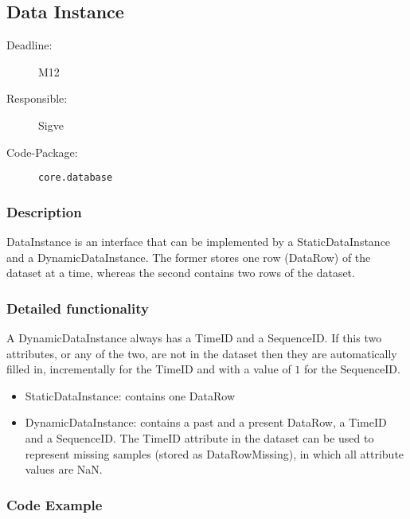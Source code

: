 \newpage
\subsection{Data Instance}
\label{Functionality:ID}

\begin{description}
\item[Deadline:] M12
\item[Responsible:] Sigve
\item[Code-Package:] \texttt{core.database}
\end{description}

\subsubsection*{Description}

DataInstance is an interface that can be implemented by a StaticDataInstance and a DynamicDataInstance. The former stores one row (DataRow) of the dataset at a time, whereas the second contains two rows of the dataset. 

\subsubsection*{Detailed functionality}

A DynamicDataInstance always has a TimeID and a SequenceID. If this two attributes, or any of the two, are not in the dataset then they are automatically filled in, incrementally for the TimeID and with a value of $1$ for the SequenceID.

\begin{itemize}
\item StaticDataInstance: contains one DataRow
\item DynamicDataInstance: contains a past and a present DataRow, a TimeID and a SequenceID. The TimeID attribute in the dataset can be used to represent missing samples (stored as DataRowMissing), in which all attribute values are NaN.
\end{itemize}

\subsubsection*{Code Example}

